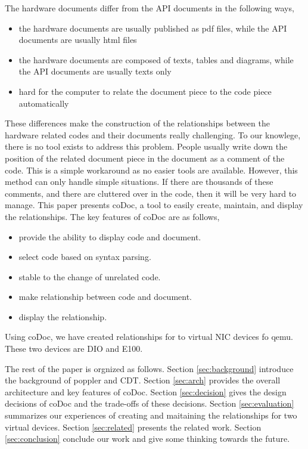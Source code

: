 \documentclass[11pt,letterpaper,oneside]{article}
\begin{document}
The hardware documents differ from the API documents in the following ways,
\begin{itemize}
\item the hardware documents are usually published as pdf files, while the API documents are usually html files
\item the hardware documents are composed of texts, tables and diagrams, while the API documents are usually texts only
\item hard for the computer to relate the document piece to the code piece automatically
\end{itemize}

These differences make the construction of the relationships between the hardware related codes and their documents really challenging.
To our knowlege, there is no tool exists to address this problem.
People usually write down the position of the related document piece in the document as a comment of the code.
This is a simple workaround as no easier tools are available.
However, this method can only handle simple situations.
If there are thousands of these comments, 
and there are cluttered over in the code,
then it will be very hard to manage.
This paper presents coDoc, a tool to easily create, maintain, and display the relationships.
The key features of coDoc are as follows,
\begin{itemize}
\item provide the ability to display code and document. 
\item select code based on syntax parsing.
\item stable to the change of unrelated code.
\item make relationship between code and document.
\item display the relationship.
\end{itemize}

Using coDoc, we have created relationships for to virtual NIC devices fo qemu.
These two devices are DIO and E100.

The rest of the paper is orgnized as follows. 
Section \ref{sec:background} introduce the background of poppler and CDT.
Section \ref{sec:arch} provides the overall architecture and key features of coDoc.
Section \ref{sec:decision} gives the design decisions of coDoc and the trade-offs of these decisions.
Section \ref{sec:evaluation} summarizes our experiences of creating and maitaining the relationships for two virtual devices.
Section \ref{sec:related} presents the related work.
Section \ref{sec:conclusion} conclude our work and give some thinking towards the future.
\end{document}
